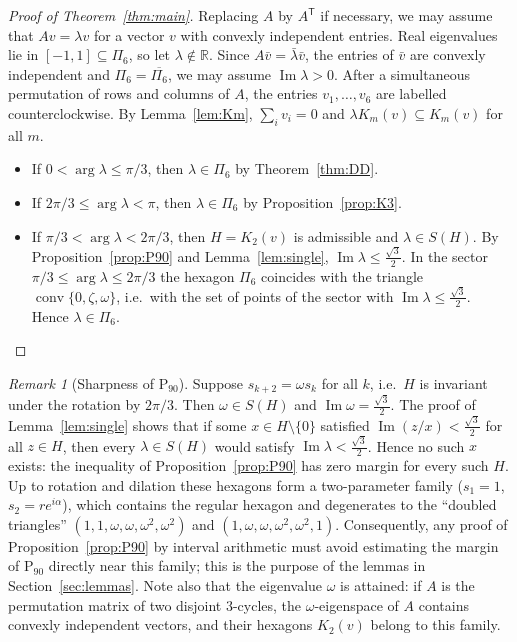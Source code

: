 \documentclass[11pt]{amsart}
\theoremstyle{definition}
\theoremstyle{remark}
\newtheorem{remark}[theorem]{Remark}
\newcommand{\R}{\mathbb{R}}
\newcommand{\conv}{\operatorname{conv}}
\renewcommand{\Im}{\operatorname{Im}}
\newcommand{\Pn}{\mathrm{P}_{90}}
\newcommand{\sq}{\tfrac{\sqrt3}{2}}
\begin{document}
\begin{proof}[Proof of Theorem~\ref{thm:main}]
Replacing $A$ by $A^{\mathsf T}$ if necessary, we may assume that $Av=\lambda v$ for a vector $v$ with convexly independent entries. Real eigenvalues lie in $[-1,1]\subseteq\Pi_6$, so let $\lambda\notin\R$. Since $A\bar v=\bar\lambda\bar v$, the entries of $\bar v$ are convexly independent and $\Pi_6=\overline{\Pi_6}$, we may assume $\Im\lambda>0$. After a simultaneous permutation of rows and columns of $A$, the entries $v_1,\dots,v_6$ are labelled counterclockwise. By Lemma~\ref{lem:Km}, $\sum_iv_i=0$ and $\lambda K_m(v)\subseteq K_m(v)$ for all $m$.
\begin{itemize}[leftmargin=2em]
\item If $0<\arg\lambda\le\pi/3$, then $\lambda\in\Pi_6$ by Theorem~\ref{thm:DD}.
\item If $2\pi/3\le\arg\lambda<\pi$, then $\lambda\in\Pi_6$ by Proposition~\ref{prop:K3}.
\item If $\pi/3<\arg\lambda<2\pi/3$, then $H=K_2(v)$ is admissible and $\lambda\in S(H)$. By Proposition~\ref{prop:P90} and Lemma~\ref{lem:single}, $\Im\lambda\le\sq$. In the sector $\pi/3\le\arg\lambda\le2\pi/3$ the hexagon $\Pi_6$ coincides with the triangle $\conv\{0,\zeta,\omega\}$, i.e.\ with the set of points of the sector with $\Im\lambda\le\sq$. Hence $\lambda\in\Pi_6$. \qedhere
\end{itemize}
\end{proof}

\begin{remark}[Sharpness of $\Pn$]\label{rem:sharp}
Suppose $s_{k+2}=\omega s_k$ for all $k$, i.e.\ $H$ is invariant under the rotation by $2\pi/3$. Then $\omega\in S(H)$ and $\Im\omega=\sq$. The proof of Lemma~\ref{lem:single} shows that if some $x\in H\setminus\{0\}$ satisfied $\Im(z/x)<\sq$ for all $z\in H$, then every $\lambda\in S(H)$ would satisfy $\Im\lambda<\sq$. Hence no such $x$ exists: the inequality of Proposition~\ref{prop:P90} has zero margin for every such $H$. Up to rotation and dilation these hexagons form a two-parameter family ($s_1=1$, $s_2=re^{i\alpha}$), which contains the regular hexagon and degenerates to the ``doubled triangles'' $(1,1,\omega,\omega,\omega^2,\omega^2)$ and $(1,\omega,\omega,\omega^2,\omega^2,1)$. Consequently, any proof of Proposition~\ref{prop:P90} by interval arithmetic must avoid estimating the margin of $\Pn$ directly near this family; this is the purpose of the lemmas in Section~\ref{sec:lemmas}. Note also that the eigenvalue $\omega$ is attained: if $A$ is the permutation matrix of two disjoint $3$-cycles, the $\omega$-eigenspace of $A$ contains convexly independent vectors, and their hexagons $K_2(v)$ belong to this family.
\end{remark}
\end{document}
